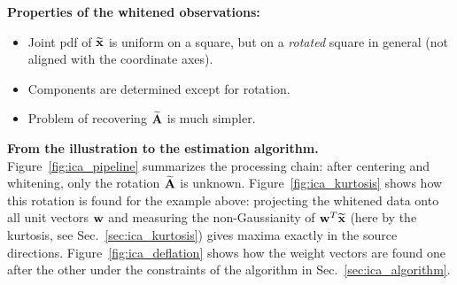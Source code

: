   \textbf{Properties of the whitened observations:}
  \begin{itemize}
    \item Joint pdf of $\widetilde{\bm{\mathrm{x}}}$ is uniform on a square, but on a \emph{rotated} square in general (not aligned with the coordinate axes).
    \item Components are determined except for rotation.
    \item Problem of recovering $\mathbf{\widetilde A}$ is much simpler.
  \end{itemize}

  \textbf{From the illustration to the estimation algorithm.}
  Figure~\ref{fig:ica_pipeline} summarizes the processing chain: after centering and whitening, only the rotation $\mathbf{\widetilde A}$ is unknown. Figure~\ref{fig:ica_kurtosis} shows how this rotation is found for the example above: projecting the whitened data onto all unit vectors $\bm{\mathrm{w}}$ and measuring the non-Gaussianity of $\bm{\mathrm{w}}^T\widetilde{\bm{\mathrm{x}}}$ (here by the kurtosis, see Sec.~\ref{sec:ica_kurtosis}) gives maxima exactly in the source directions. Figure~\ref{fig:ica_deflation} shows how the weight vectors are found one after the other under the constraints of the algorithm in Sec.~\ref{sec:ica_algorithm}.

